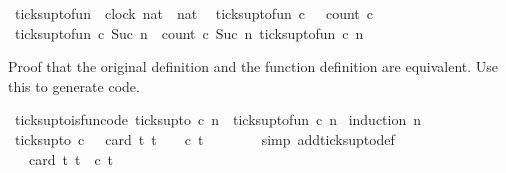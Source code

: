 \begin{isabellebody}
\begin{isamarkuptext}
\end{isamarkuptext}\isamarkuptrue%
\isamarkupfalse%
\ ticks{\isacharunderscore}up{\isacharunderscore}to{\isacharunderscore}fun\ {\isacharcolon}{\isacharcolon}\ {\isacartoucheopen}{\isacharbrackleft}clock{\isacharcomma}\ nat{\isacharbrackright}\ {\isasymRightarrow}\ nat{\isacartoucheclose}\isanewline
{}\isanewline
\ \ {\isacartoucheopen}ticks{\isacharunderscore}up{\isacharunderscore}to{\isacharunderscore}fun\ c\ {}\ {\isacharequal}\ count\ {\isacharparenleft}c\ {}{\isacharparenright}\ {}{\isacartoucheclose}\isanewline
{\isacharbar}\ {\isacartoucheopen}ticks{\isacharunderscore}up{\isacharunderscore}to{\isacharunderscore}fun\ c\ {\isacharparenleft}Suc\ n{\isacharparenright}\ {\isacharequal}\ count\ {\isacharparenleft}c\ {\isacharparenleft}Suc\ n{\isacharparenright}{\isacharparenright}\ {\isacharparenleft}ticks{\isacharunderscore}up{\isacharunderscore}to{\isacharunderscore}fun\ c\ n{\isacharparenright}{\isacartoucheclose}%
\begin{isamarkuptext}%
Proof that the original definition and the function definition are equivalent.
Use this to generate code.%
\end{isamarkuptext}\isamarkuptrue%
\isamarkupfalse%
\ ticks{\isacharunderscore}up{\isacharunderscore}to{\isacharunderscore}is{\isacharunderscore}fun{\isacharbrackleft}code{\isacharbrackright}{\isacharcolon}\ {\isacartoucheopen}ticks{\isacharunderscore}up{\isacharunderscore}to\ c\ n\ {\isacharequal}\ ticks{\isacharunderscore}up{\isacharunderscore}to{\isacharunderscore}fun\ c\ n{\isacartoucheclose}\isanewline
%
\isadelimproof
%
\endisadelimproof
%
\isatagproof
{}\isamarkupfalse%
\ {\isacharparenleft}induction\ n{\isacharparenright}\isanewline
\ \ \isamarkupfalse%
\ {}\isanewline
\ \ \ \ \isamarkupfalse%
\ {\isacartoucheopen}ticks{\isacharunderscore}up{\isacharunderscore}to\ c\ {}\ {\isacharequal}\ card\ {\isacharbraceleft}t{\isachardot}\ t\ {\isasymle}\ {}\ {\isasymand}\ c\ t{\isacharbraceright}{\isacartoucheclose}\isanewline
\ \ \ \ \ \ \isamarkupfalse%
\ {\isacharparenleft}simp\ add{\isacharcolon}ticks{\isacharunderscore}up{\isacharunderscore}to{\isacharunderscore}def{\isacharparenright}\isanewline
\ \ \ \ \isamarkupfalse%
\ \isamarkupfalse%
\ {\isacartoucheopen}{\isachardot}{\isachardot}{\isachardot}\ {\isacharequal}\ card\ {\isacharbraceleft}t{\isachardot}\ t{\isacharequal}{}\ {\isasymand}\ c\ t{\isacharbraceright}{\isacartoucheclose}\ \isamarkupfalse%

\end{isabellebody}
